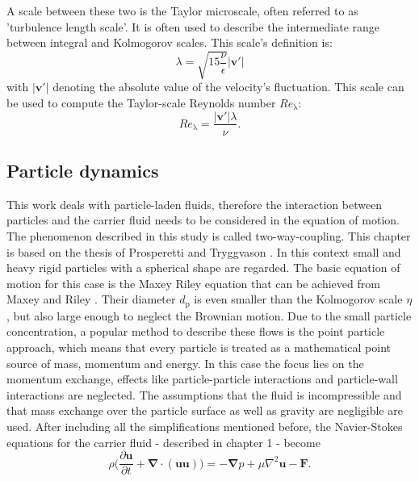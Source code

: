 \documentclass[11pt,a4paper,openany,oneside,parskip=half*]{article}
\renewcommand*\vec[1]{\boldsymbol{#1}}
\begin{document}
\newline
A scale between these two is the Taylor microscale, often referred to as 'turbulence length scale'. 
It is often used to describe the intermediate range between integral and Kolmogorov scales. 
This scale's definition is: 
\begin{equation}
\lambda = \sqrt{15 \frac{\nu}{\epsilon}} |\vec{v'}|
\end{equation}
with $|\vec{v'}|$ denoting the absolute value of the velocity's fluctuation. This scale can be used to compute the Taylor-scale Reynolds number $Re_\mathrm{\lambda}$:
\begin{equation}
Re_\mathrm{\lambda} = \frac{|\vec{v'}| \lambda}{\nu}.
\end{equation}
\pagebreak
\subsection{Particle dynamics} %
This work deals with particle-laden fluids, therefore the interaction between particles and the carrier fluid needs to be considered in the equation of motion. The phenomenon described in this study is called two-way-coupling. This chapter is based on the thesis of Prosperetti and Tryggvason \cite{computationalMethodsforMultiphaseFlow}.
\newline
In this context small and heavy rigid particles with a spherical shape are regarded. The basic equation of motion for this case is the Maxey Riley equation that can be achieved from Maxey and Riley \cite{EquationOfMotionForASmallRigidSphereInANonuniformFlow}. Their diameter $ d_\mathrm{p} $ is even smaller than the Kolmogorov scale $ \eta $, but also large enough to neglect the Brownian motion.
\newline
Due to the small particle concentration, a popular method to describe these flows is the point particle approach, which means that every particle is treated as a mathematical point source of mass, momentum and energy. In this case the focus lies on the momentum exchange, effects like particle-particle interactions and particle-wall interactions are neglected.  
\newline
The assumptions that the fluid is incompressible and that mass exchange over the particle surface as well as gravity are negligible are used. 
After including all the simplifications mentioned before, the Navier-Stokes equations for the carrier fluid - described in chapter 1 - become
\begin{equation}
\rho\biggl(\frac{\partial{\vec{u}}}{\partial{t}}+\vec{\nabla} \cdot (\vec{u}\vec{u})\biggl) = -\vec{\nabla}p + \mu\nabla^\mathrm{2}\vec{u}-\vec{F}.
\end{equation}
\end{document}
